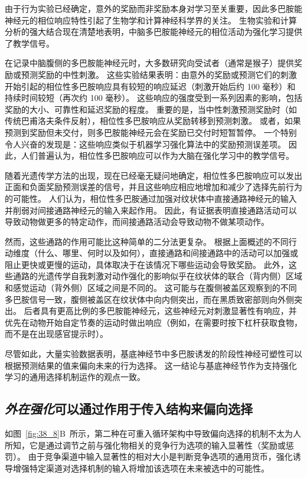 由于行为实验已经确定，意外的奖励而非奖励本身对学习至关重要，因此多巴胺能神经元的相位响应特性引起了生物学和计算神经科学界的关注。
生物实验和计算分析的强大结合现在清楚地表明，中脑多巴胺能神经元的相位活动为强化学习提供了教学信号。


在记录中脑腹侧的多巴胺能神经元时，大多数研究向受试者（通常是猴子）提供奖励或预测奖励的中性刺激。
这些实验结果表明：由意外的奖励或预测它们的刺激开始引起的相位性多巴胺响应具有较短的响应延迟（刺激开始后约 100 毫秒）和持续时间较短（再次约 100 毫秒）。
这些响应的强度受到一系列因素的影响，包括奖励的大小、可靠性和延迟奖励的程度。
重要的是，当中性刺激预测奖励时（如传统巴甫洛夫条件反射），相位性多巴胺响应从奖励转移到预测刺激。
或者，如果预测到奖励但未交付，则多巴胺能神经元会在奖励已交付时短暂暂停。
一个特别令人兴奋的发现是：这些响应类似于机器学习强化算法中的奖励预测误差项。
因此，人们普遍认为，相位性多巴胺响应可以作为大脑在强化学习中的教学信号。


随着光遗传学方法的出现，现在已经毫无疑问地确定，相位性多巴胺响应可以发出正面和负面奖励预测误差的信号，并且这些响应相应地增加和减少了选择先前行为的可能性。
人们认为，相位性多巴胺通过加强对纹状体中直接通路神经元的输入并削弱对间接通路神经元的输入来起作用。
因此，有证据表明直接通路活动可以导致动物做更多的特定动作，而间接通路活动会导致动物不做某项动作。


然而，这些通路的作用可能比这种简单的二分法更复杂。
根据上面概述的不同行动维度（什么、哪里、何时以及如何），直接通路和间接通路中的活动可以加强或阻止更快或更慢的运动，具体取决于在该情况下哪些运动会导致奖励。
此外，这些通路的光遗传学自我刺激对动作强化的影响似乎在纹状体的联合（背内侧）区域和感觉运动（背外侧）区域之间是不同的。
这可能与在腹侧被盖区观察到的不同多巴胺信号一致，腹侧被盖区在纹状体中向内侧突出，而在黑质致密部则向外侧突出。
后者具有更高比例的多巴胺能神经元，这些神经元对刺激显著性有响应，并优先在动物开始自定节奏的运动时做出响应（例如，在需要时按下杠杆获取食物，而不是在出现感官提示时）。


尽管如此，大量实验数据表明，基底神经节中多巴胺诱发的阶段性神经可塑性可以根据预测结果的值来偏向未来的行为选择。
这一结论与基底神经节作为支持强化学习的通用选择机制运作的观点一致。



\subsection{\textit{外在强化}可以通过作用于传入结构来偏向选择}

如图~\ref{fig:38_8}B~所示，第二种在可重入循环架构中导致偏向选择的机制不太为人所知，它是通过调节之前与强化物相关的竞争行为选项的输入显著性（奖励或惩罚）。
由于竞争渠道中输入显著性的相对大小是判断竞争选项的通用货币，强化诱导增强特定渠道对选择机制的输入将增加该选项在未来被选中的可能性。


